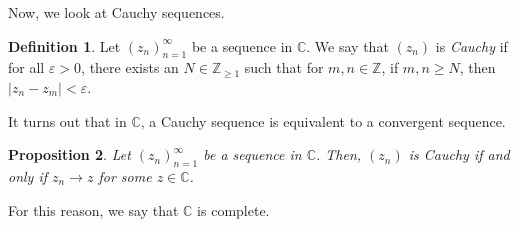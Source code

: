 \documentclass[a4paper, openany]{memoir}
\theoremstyle{definition}
\newtheorem{definition}{Definition}[section]
\theoremstyle{plain}
\newtheorem{proposition}[definition]{Proposition}
\begin{document}
Now, we look at Cauchy sequences.
\begin{definition}
Let $(z_n)_{n=1}^{\infty}$ be a sequence in $\mathbb{C}$. We say that $(z_n)$ is \emph{Cauchy} if for all $\varepsilon > 0$, there exists an $N \in \mathbb{Z}_{\geqslant 1}$ such that for $m, n \in \mathbb{Z}$, if $m, n \geqslant N$, then $|z_n - z_m| < \varepsilon$.
\end{definition}
\noindent It turns out that in $\mathbb{C}$, a Cauchy sequence is equivalent to a convergent sequence.
\begin{proposition}
Let $(z_n)_{n=1}^{\infty}$ be a sequence in $\mathbb{C}$. Then, $(z_n)$ is Cauchy if and only if $z_n \to z$ for some $z \in \mathbb{C}$.
\end{proposition}
    
\noindent For this reason, we say that $\mathbb{C}$ is complete.
\end{document}
